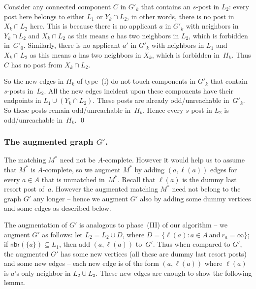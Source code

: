\documentclass[11pt]{llncs}
\newcommand{\Nbr}{\mathsf{nbr}}
\begin{document}
Consider any connected component $C$ in $G'_k$ that contains an $s$-post in $L_2$: every post 
here belongs to either $L_1$ or $Y_k \cap L_2$, in other words, there is no post in 
$X_k \cap L_2$ here. This is because there is no applicant $a$ in $G'_k$ with neighbors in 
$Y_k \cap L_2$ and  $X_k \cap L_2$ as this means $a$ has two neighbors in $L_2$, which  is 
forbidden in~$G'_0$. 
Similarly, there is no applicant $a'$ in $G'_k$ with neighbors in $L_1$ and 
$X_k \cap L_2$ as this means $a$ has two neighbors in $X_k$, which  is forbidden in~$H_k$. 
Thus $C$ has no post from $X_k \cap L_2$.

So the new edges in $H_k$ of type~(i) do not touch components in $G'_k$ that contain $s$-posts 
in~$L_2$. All the new edges incident upon these components have their endpoints in 
$L_1 \cup (Y_k \cap L_2)$. These posts  are already odd/unreachable in~$G'_k$. So these posts 
remain  odd/unreachable in~$H_k$. Hence every $s$-post in $L_2$ is odd/unreachable in~$H_k$. \qed




\subsubsection*{The augmented graph $G'$.}
The matching $M^*$ need not be $A$-complete. However it would help us to assume that $M^*$ is 
$A$-complete, so we augment $M^*$ by adding $(a,\ell(a))$ edges for every $a \in A$ that
is unmatched in~$M^*$. Recall that $\ell(a)$ is the dummy last resort post of~$a$.
However the augmented matching $M^*$ need not belong to the graph $G'$ any longer -- hence
we augment $G'$ also by adding some dummy vertices and some edges as described below. 

The augmentation of $G'$ is analogous to phase~(III) of our algorithm -- we augment $G'$ as
follows: let $L_2 = L_2 \cup D$, where $D = \{\ell(a): a \in A\ \mathrm{and}\ r_a=\infty\}$;
if $\Nbr(\{a\}) \subseteq L_1$, then add $(a,\ell(a))$ to~$G'$. Thus when compared to $G'$, 
the augmented $G'$ has some new vertices (all these are dummy last resort posts) and 
some new edges -- each new edge is of the form $(a,\ell(a))$ where $\ell(a)$ is $a$'s only
neighbor in $L_2\cup L_3$.
These new edges are enough to show the following lemma.
\end{document}
